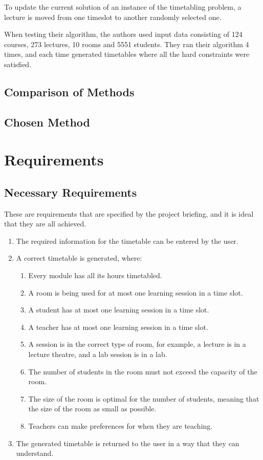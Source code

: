 \documentclass[a4paper, 12pt]{report}
\begin{document}
To update the current solution of an instance of the timetabling problem, a
lecture is moved from one timeslot to another randomly selected one.

When testing their algorithm, the authors used input data consisting of 
124 courses, 273 lectures, 10 rooms and 5551 students. They ran their algorithm 
4 times, and each time generated timetables where all the hard constraints were
satisfied.

\section{Comparison of Methods}  %

\section{Chosen Method}  %

\chapter{Requirements}  %

\section{Necessary Requirements}

These are requirements that are specified by the project briefing, and it is
ideal that they are all achieved.
\begin{enumerate}
	\item The required information for the timetable can be entered by the user.
	\item A correct timetable is generated, where:
	\begin{enumerate}
		\item Every module has all its hours timetabled.
		\item A room is being used for at most one learning session in a time 
			slot.
		\item A student has at most one learning session in a time slot.
		\item A teacher has at most one learning session in a time slot.
		\item A session is in the correct type of room, for example, a lecture
			is in a lecture theatre, and a lab session is in a lab.
		\item The number of students in the room must not exceed the capacity of
			the room.
		\item The size of the room is optimal for the number of students,
			meaning that the size of the room as small as possible.
		\item Teachers can make preferences for when they are teaching.
	\end{enumerate}
	\item The generated timetable is returned to the user in a way that they can
		understand.
\end{enumerate}
\end{document}
